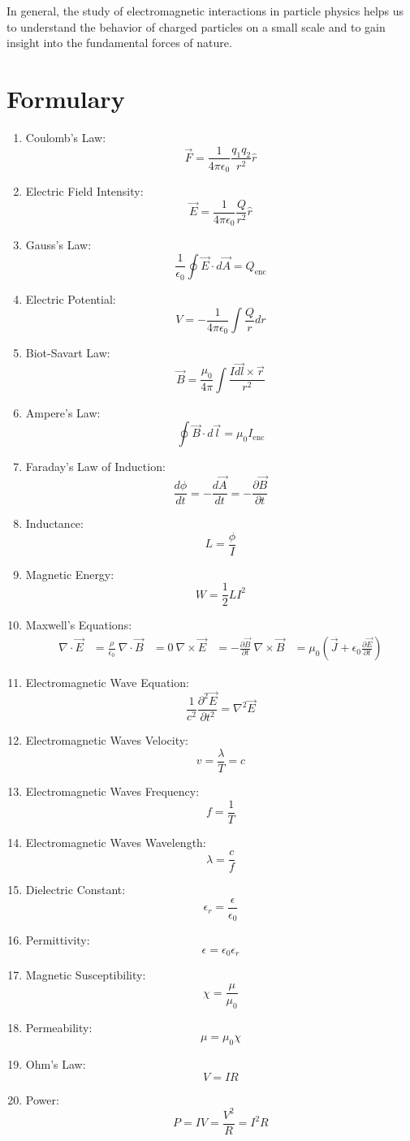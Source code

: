 \documentclass{article}
\begin{document}
In general, the study of electromagnetic interactions in particle physics helps
us to understand the behavior of charged particles on a small scale and to gain
insight into the fundamental forces of nature.

\section{Formulary} %
\label{sec:Formulary}

\begin{enumerate}
  \item Coulomb's Law: $$\vec{F} = \frac{1}{4\pi\epsilon_0} \frac{q_1q_2}{r^2} \hat{r}$$
  \item Electric Field Intensity:$$ \vec{E} = \frac{1}{4\pi\epsilon_0} \frac{Q}{r^2} \hat{r}$$
  \item Gauss's Law:$$ \frac{1}{\epsilon_0} \oint \vec{E} \cdot d\vec{A} = Q_{\text{enc}}$$
  \item Electric Potential:$$ V = -\frac{1}{4\pi\epsilon_0} \int \frac{Q}{r} dr$$
  \item Biot-Savart Law:$$ \vec{B} = \frac{\mu_0}{4\pi} \int \frac{I \vec{dl} \times \vec{r}}{r^2}$$
  \item Ampere's Law:$$ \oint \vec{B} \cdot d\vec{l} = \mu_0 I_{\text{enc}}$$
  \item Faraday's Law of Induction:$$ \frac{d\phi}{dt} = -\frac{d\vec{A}}{dt} = -\frac{\partial \vec{B}}{\partial t}$$
  \item Inductance:$$ L = \frac{\phi}{I}$$
  \item Magnetic Energy:$$ W = \frac{1}{2} LI^2$$
  \item Maxwell's Equations:
    \begin{align*}
    \nabla \cdot \vec{E} &= \frac{\rho}{\epsilon_0} \
    \nabla \cdot \vec{B} &= 0 \
    \nabla \times \vec{E} &= -\frac{\partial \vec{B}}{\partial t} \
    \nabla \times \vec{B} &= \mu_0 \left(\vec{J} + \epsilon_0 \frac{\partial \vec{E}}{\partial t}\right)
    \end{align*}
  \item Electromagnetic Wave Equation:$$ \frac{1}{c^2} \frac{\partial^2 \vec{E}}{\partial t^2} = \nabla^2 \vec{E}$$
  \item Electromagnetic Waves Velocity:$$ v = \frac{\lambda}{T} = c$$
  \item Electromagnetic Waves Frequency:$$ f = \frac{1}{T}$$
  \item Electromagnetic Waves Wavelength: $$\lambda = \frac{c}{f}$$
  \item Dielectric Constant:$$ \epsilon_r = \frac{\epsilon}{\epsilon_0}$$
  \item Permittivity:$$ \epsilon = \epsilon_0 \epsilon_r$$
  \item Magnetic Susceptibility:$$ \chi = \frac{\mu}{\mu_0}$$
  \item Permeability: $$\mu = \mu_0 \chi$$
  \item Ohm's Law: $$V = IR$$
  \item Power: $$P = IV = \frac{V^2}{R} = I^2R$$
\end{enumerate}
\end{document}
